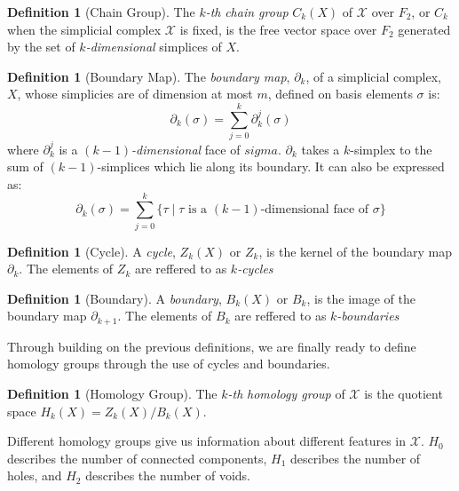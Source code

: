 \documentclass[ma]{uncgdissertationexp}
\theoremstyle{plain}
\theoremstyle{definition}
\newtheorem{definition}[theorem]{Definition}
\theoremstyle{remark}
\begin{document}
\begin{definition}[Chain Group]
\par The $k$\textit{-th} \textit{chain group} $C_k(X)$ of $\mathcal{X}$ over $F_2$, or $C_k$ when the simplicial complex $\mathcal{X}$ is fixed, is the free vector space over $F_2$ generated by the set of $k$\textit{-dimensional} simplices of $X$.
\end{definition}

\begin{definition}[Boundary Map]
\par The \textit{boundary map}, $\partial_{k}$, of a simplicial complex, $X$, whose simplicies are of dimension at most $m$, defined on basis elements $\sigma$ is:
$$\partial_{k}(\sigma)=\sum^{k}_{j=0}\partial^{j}_{k}(\sigma)$$
where $\partial^{j}_{k}$ is a $(k-1)$\textit{-dimensional} face of $sigma$. $\partial_{k}$ takes a $k$-simplex to the sum of $(k-1)$-simplices which lie along its boundary. It can also be expressed as:
$$\partial_{k}(\sigma)=\sum^{k}_{j=0}\big\{\tau \mid \tau \text{ is a }(k-1)\text{-dimensional face of } \sigma \big\}$$
\end{definition}

\begin{definition}[Cycle]
\par A \textit{cycle}, $Z_{k}(X)$ or $Z_k$, is the kernel of the boundary map $\partial_{k}$. The elements of $Z_k$ are reffered to as $k$\textit{-cycles}
\end{definition}

\begin{definition}[Boundary]
\par A \textit{boundary}, $B_{k}(X)$ or $B_k$, is the image of the boundary map $\partial_{k+1}$. The elements of $B_k$ are reffered to as $k$\textit{-boundaries}
\end{definition}

\par Through building on the previous definitions, we are finally ready to define homology groups through the use of cycles and boundaries.

\begin{definition}[Homology Group]
\par The $k$\textit{-th} \textit{homology group} of $\mathcal{X}$ is the quotient space $H_k(X) = Z_{k}(X)/B_{k}(X)$.
\end{definition}

\par Different homology groups give us information about different features in $\mathcal{X}$. $H_{0}$ describes the number of connected components, $H_{1}$ describes the number of holes, and $H_{2}$ describes the number of voids.
\end{document}
